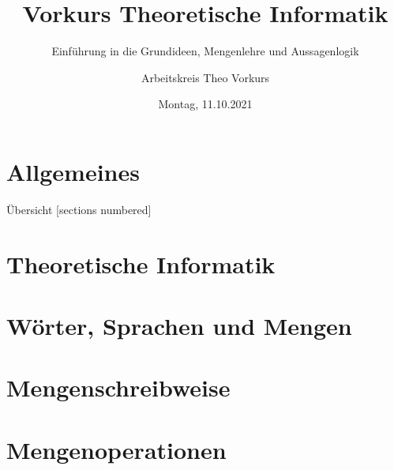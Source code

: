 

\title{Vorkurs Theoretische Informatik}
\subtitle{Einführung in die Grundideen, Mengenlehre und Aussagenlogik}
\date{Montag, 11.10.2021}
\author{Arbeitskreis Theo Vorkurs}



\maketitle

\section{Allgemeines}



\begin{frame}[fragile]{Übersicht}
	[sections numbered]
	\tableofcontents%
\end{frame}

\section{Theoretische Informatik}



\section{Wörter, Sprachen und Mengen}






\section{Mengenschreibweise}



\section{Mengenoperationen}



